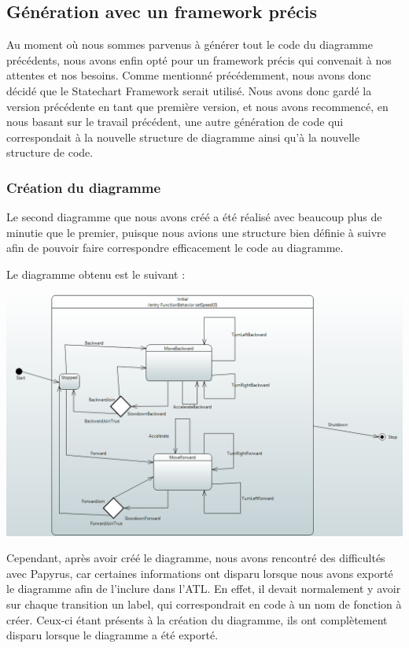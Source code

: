 \documentclass[french, 12pt, a4paper]{article}
\begin{document}
\subsection{Génération avec un framework précis}
    Au moment où nous sommes parvenus à générer tout le code du diagramme précédents, nous avons enfin opté pour un framework précis qui convenait à nos attentes et nos besoins. Comme mentionné précédemment, nous avons donc décidé que le Statechart Framework serait utilisé. Nous avons donc gardé la version précédente en tant que première version, et nous avons recommencé, en nous basant sur le travail précédent, une autre génération de code qui correspondait à la nouvelle structure de diagramme ainsi qu'à la nouvelle structure de code.
    
    \subsubsection{Création du diagramme}
    Le second diagramme que nous avons créé a été réalisé avec beaucoup plus de minutie que le premier, puisque nous avions une structure bien définie à suivre afin de pouvoir faire correspondre efficacement le code au diagramme.
    
    Le diagramme obtenu est le suivant : 
    \begin{center}
			\captionsetup{type=figure}
			\includegraphics[scale=0.6]{Images/diagrammeV2.PNG}
	\end{center}
	
	Cependant, après avoir créé le diagramme, nous avons rencontré des difficultés avec Papyrus, car certaines informations ont disparu lorsque nous avons exporté le diagramme afin de l'inclure dans l'ATL. En effet, il devait normalement y avoir sur chaque transition un label, qui correspondrait en code à un nom de fonction à créer. Ceux-ci étant présents à la création du diagramme, ils ont  complètement disparu lorsque le diagramme a été exporté. 
    
\end{document}
